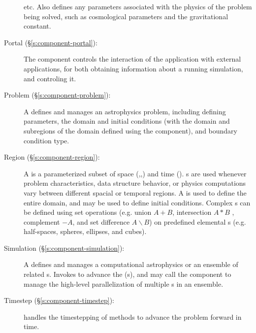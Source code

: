 \begin{description}
        etc.  Also defines any parameters associated with the physics
        of the problem being solved, such as cosmological parameters
        and the gravitational constant.
%
 \item [\todo Portal (\S\ref{s:component-portal}): ]
%
        The  component controls the interaction of the
        application with external applications, for both obtaining
        information about a running simulation, and controling it.
%
 \item [\done Problem (\S\ref{s:component-problem}): ]
%
   A  defines and manages an astrophysics problem,
   including defining  parameters, the domain and
   initial conditions (with the domain and subregions of the domain
   defined using the  component), and boundary condition
   type.
%
 \item [\done Region (\S\ref{s:component-region}): ]
%
   A  is a parameterized subset of space (,,) and
   time ().  s are used whenever problem characteristics,
   data structure behavior, or physics computations vary between
   different spacial or temporal regions.  A  is used to
   define the entire domain, and may be used to define initial
   conditions.  Complex s can be defined using set operations
   (e.g. union $A + B$, intersection $A * B$ , complement $- A$, and set
   difference $A \backslash B$) on predefined elemental s
   (e.g. half-spaces, spheres, ellipses, and cubes).
%
 \item [\done Simulation (\S\ref{s:component-simulation}): ]
%
   A  defines and manages a computational
   astrophysics  or an ensemble of related
   s. Invokes  to advance the
   (s), and may call the  component to
   manage the high-level parallelization of multiple s
   in an ensemble.
%
 \item [\todo Timestep (\S\ref{s:component-timestep}): ]
%
         handles the timestepping of methods to advance
        the problem forward in time.
\end{description}





















% 
% 
% 
% 
% 
% 
% 
% 
% 
% 

